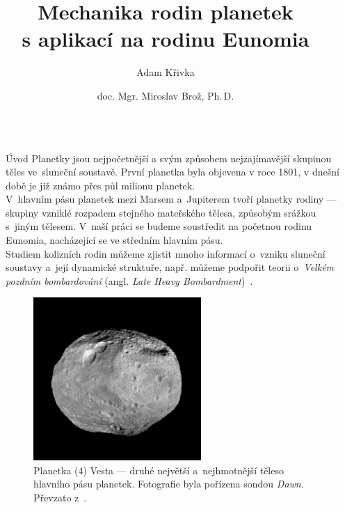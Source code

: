 \documentclass{beamer}
\title{Mechanika rodin planetek \\ s aplikací na rodinu Eunomia}
\author{Adam Křivka \\ \and doc. Mgr. Miroslav Brož, Ph.\,D.}
\institute{Cyrilometodějské gymnázium a střední odborná škola pedagogická Brno,\\ Lerchova 63, 602 00 Brno}
\newlength{\sep}
\newlength{\vyskaA}
\newlength{\side}
\newlength{\newparskip}
\begin{document}
\begin{frame}
\begin{columns}[t]

\begin{column}{\sep}
\end{column}
\begin{column}{\side}
	\begin{minipage}[t][0.5\vyskaA][t]{\textwidth}
		\begin{block}{Úvod\phantom{Úy}}
			Planetky jsou nejpočetnější a svým způsobem nejzajímavější skupinou těles ve~sluneční soustavě. První planetka byla objevena v roce 1801, v dnešní době je již známo přes půl milionu planetek.\\[\newparskip]


			V~hlavním pásu planetek mezi Marsem a~Jupiterem tvoří planetky rodiny --- skupiny vzniklé rozpadem stejného mateřského tělesa, způsobým srážkou s~jiným tělesem. V~naší práci se budeme soustředit na početnou rodinu Eunomia, nacházející se ve středním hlavním pásu.\\[\newparskip]

			Studiem kolizních rodin můžeme zjistit mnoho informací o~vzniku sluneční soustavy a~její dynamické struktuře, např. můžeme podpořit teorii o~\textit{Velkém pozdním bombardování} (angl. \textit{Late Heavy Bombardment})~\cite{broz13}.\\[\newparskip]
			\begin{figure}[!htb]
				\centering
				\includegraphics[width=0.6\textwidth]{../obr/vesta.jpg}
				\caption{Planetka (4) Vesta --- druhé největší a~nejhmotnější těleso hlavního pásu planetek. Fotografie byla pořízena sondou \textit{Dawn}. Převzato z~\cite{jplvesta}.} \label{fig:vesta}
			\end{figure}
		\end{block}
	\end{minipage}


\end{column}
\end{columns}
\end{frame}
\end{document}
